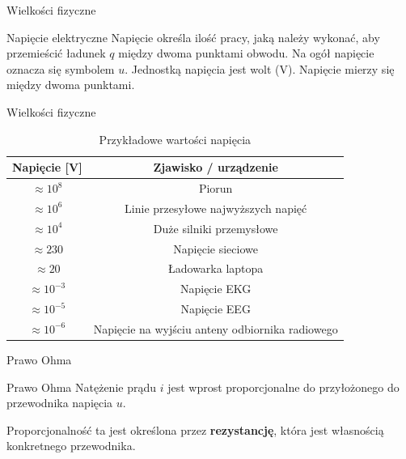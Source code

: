 \begin{frame}{Wielkości fizyczne}
	\begin{block}{Napięcie elektryczne}
		Napięcie określa ilość pracy, jaką należy wykonać, aby przemieścić ładunek $q$ między dwoma punktami obwodu.
		Na ogół napięcie oznacza się symbolem $u$.
		Jednostką napięcia jest wolt ($\text{V}$).
		Napięcie mierzy się między dwoma punktami.
	\end{block}
\end{frame}

\begin{frame}{Wielkości fizyczne}
	\begin{table}
		\centering
		\caption{Przykładowe wartości napięcia}
		\begin{tabular}{|c|c|}
			\hline
			Napięcie [V]      & Zjawisko / urządzenie                           \\ \hline
			$\approx 10^{8}$  & Piorun                                          \\ \hline
			$\approx 10^{6}$  & Linie przesyłowe najwyższych napięć             \\ \hline
			$\approx 10^{4}$  & Duże silniki przemysłowe                        \\ \hline
			$\approx 230$     & Napięcie sieciowe                               \\ \hline
			$\approx 20$      & Ładowarka laptopa                               \\ \hline
			$\approx 10^{-3}$ & Napięcie EKG                                    \\ \hline
			$\approx 10^{-5}$ & Napięcie EEG                                    \\ \hline
			$\approx 10^{-6}$ & Napięcie na wyjściu anteny odbiornika radiowego \\ \hline
		\end{tabular}
	\end{table}
\end{frame}

\begin{frame}{Prawo Ohma}
	\begin{block}{Prawo Ohma}
		Natężenie prądu $i$ jest wprost proporcjonalne do przyłożonego do przewodnika napięcia $u$.
	\end{block}
	Proporcjonalność ta jest określona przez \textbf{rezystancję}, która jest własnością konkretnego przewodnika.
\end{frame}

